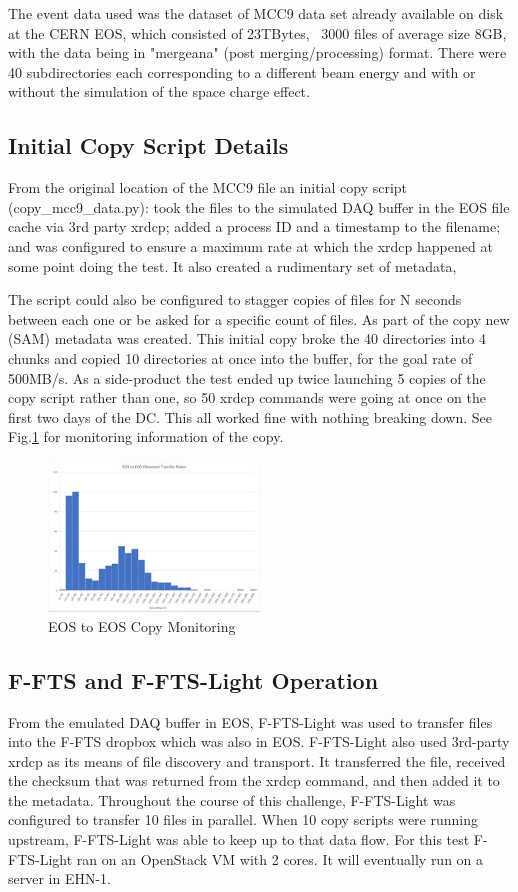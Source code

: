 \documentclass[pdftex,12pt,letter]{article}
\begin{document}
The event data used was the dataset of MCC9 data set already available on disk at the CERN EOS, which consisted of
23TBytes,  ~3000 files of average size 8GB, with the data being in  "mergeana" (post merging/processing)  format. There were 
40 subdirectories each corresponding to a different beam energy and with or without the simulation of the space charge effect.

\subsection{Initial Copy Script Details}
From the original location of the MCC9 file  an initial copy script (copy\_mcc9\_data.py): took the files to the simulated DAQ buffer in the EOS file cache via 3rd party xrdcp; added a process ID and a timestamp to the filename; and was configured to ensure a maximum rate at which the xrdcp happened at some point doing the test. It also created a rudimentary set of metadata,

The script could also be configured to stagger copies of files for N seconds between each one or be asked for a specific  count of files. As part of the copy new (SAM) metadata was created. This initial copy broke the 40 directories into 4 chunks and copied 10 directories at once into the buffer, for the goal rate of 500MB/s. As a side-product the test ended up twice launching 5 copies of the copy script rather than one, so 50 xrdcp commands were going at once on the first two days of the DC. This all worked fine with nothing breaking down. See Fig.\ref{fig:EOStoEOS} for monitoring information of the copy. 


\begin{figure}[tbh]
  \centering
  \includegraphics[width=0.5\textwidth]{./ReportImages/EOStoEOS.jpg}
  \caption{EOS to EOS Copy Monitoring}
  \label{fig:EOStoEOS}
\end{figure}

\subsection{F-FTS and F-FTS-Light Operation}
From the emulated DAQ buffer in EOS, F-FTS-Light was used to transfer files into the F-FTS dropbox which was also in EOS.  F-FTS-Light also used 3rd-party xrdcp as its means of file discovery and transport.  It transferred the file, received the checksum that was returned from the xrdcp command, and then added it to the metadata.  Throughout the course of this challenge, F-FTS-Light was configured to transfer 10 files in parallel.   When 10 copy scripts were running upstream, F-FTS-Light was able to keep up to that data flow.  For this test F-FTS-Light ran on an OpenStack VM with 2 cores.  It will eventually run on a server in EHN-1.
\end{document}
